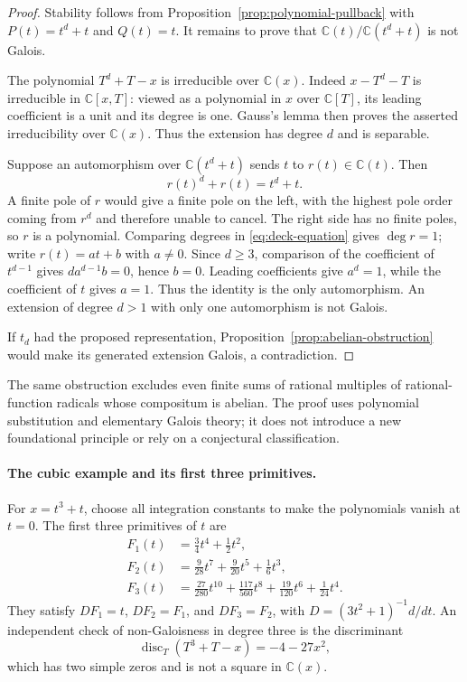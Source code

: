 \begin{proof}
Stability follows from Proposition~\ref{prop:polynomial-pullback} with
$P(t)=t^d+t$ and $Q(t)=t$. It remains to prove that
$\mathbb C(t)/\mathbb C(t^d+t)$ is not Galois.

The polynomial $T^d+T-x$ is irreducible over $\mathbb C(x)$. Indeed
$x-T^d-T$ is irreducible in $\mathbb C[x,T]$: viewed as a polynomial in $x$
over $\mathbb C[T]$, its leading coefficient is a unit and its degree is one.
Gauss's lemma then proves the asserted irreducibility over $\mathbb C(x)$.
Thus the extension has degree $d$ and is separable.

Suppose an automorphism over $\mathbb C(t^d+t)$ sends $t$ to $r(t)\in
\mathbb C(t)$. Then
\begin{equation}\label{eq:deck-equation}
 r(t)^d+r(t)=t^d+t.
\end{equation}
A finite pole of $r$ would give a finite pole on the left, with the highest
pole order coming from $r^d$ and therefore unable to cancel. The right side
has no finite poles, so $r$ is a polynomial. Comparing degrees in
\eqref{eq:deck-equation} gives $\deg r=1$; write $r(t)=at+b$ with $a\ne0$.
Since $d\ge3$, comparison of the coefficient of $t^{d-1}$ gives
$da^{d-1}b=0$, hence $b=0$. Leading coefficients give $a^d=1$, while the
coefficient of $t$ gives $a=1$. Thus the identity is the only automorphism.
An extension of degree $d>1$ with only one automorphism is not Galois.

If $t_d$ had the proposed representation, Proposition~\ref{prop:abelian-obstruction}
would make its generated extension Galois, a contradiction.
\end{proof}

The same obstruction excludes even finite sums of rational multiples of
rational-function radicals whose compositum is abelian. The proof uses
polynomial substitution and elementary Galois theory; it does not introduce
a new foundational principle or rely on a conjectural classification.

\paragraph{The cubic example and its first three primitives.}
For $x=t^3+t$, choose all integration constants to make the polynomials vanish
at $t=0$. The first three primitives of $t$ are
\begin{align*}
 F_1(t)&=\frac34t^4+\frac12t^2,\\
 F_2(t)&=\frac9{28}t^7+\frac9{20}t^5+\frac16t^3,\\
 F_3(t)&=\frac{27}{280}t^{10}+\frac{117}{560}t^8
          +\frac{19}{120}t^6+\frac1{24}t^4.
\end{align*}
They satisfy $DF_1=t$, $DF_2=F_1$, and $DF_3=F_2$, with
$D=(3t^2+1)^{-1}d/dt$. An independent check of non-Galoisness in degree three
is the discriminant
\[
 \operatorname{disc}_T(T^3+T-x)=-4-27x^2,
\]
which has two simple zeros and is not a square in $\mathbb C(x)$.

